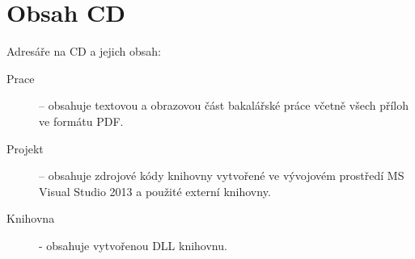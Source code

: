 \chapter{Obsah CD}
\label{prilohab}

Adresáře na CD a jejich obsah:

\begin{description}
\item [Prace] – obsahuje textovou a obrazovou část bakalářské práce včetně všech příloh ve formátu PDF.
\item [Projekt] – obsahuje zdrojové kódy knihovny vytvořené ve vývojovém prostředí MS Visual Studio 2013 a použité externí knihovny.
\item [Knihovna] - obsahuje vytvořenou DLL knihovnu.
\end{description}